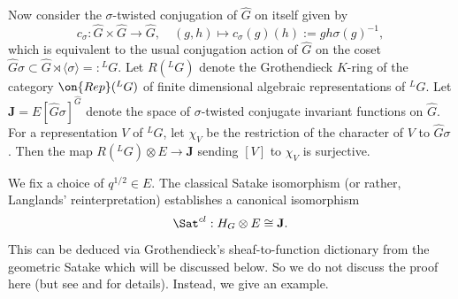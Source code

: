 \documentclass[11pt]{amsart}
\theoremstyle{definition}
\theoremstyle{definition}
\theoremstyle{definition}
\numberwithin{equation}{subsection}
\begin{document}
\medskip


Now consider the $\sigma$-twisted conjugation of $\hat G$ on itself given by
\begin{equation}
\label{E:twist conj}
c_\sigma:\hat G\times \hat G\to\hat G, \quad (g,h)\mapsto c_\sigma(g)(h):=gh\sigma(g)^{-1},
\end{equation}
which is equivalent to the usual conjugation action of $\hat G$ on the coset $\hat G\sigma\subset \hat G\rtimes\langle\sigma\rangle=:{^L}G$. Let $R({^L}G)$ denote the Grothendieck $K$-ring of the category $\on{Rep}({^L}G)$ of finite dimensional algebraic representations of ${^L}G$.
Let $\mathbf J= E[\hat G\sigma]^{\hat G}$ denote the space of $\sigma$-twisted conjugate invariant functions on $\hat G$. For a representation $V$ of ${^L}G$, let $\chi_V$ be the restriction of the character of $V$ to $\hat G\sigma$.
Then the map $R({^L}G)\otimes E\to \mathbf J$ sending $[V]$ to $\chi_V$ is surjective.

We fix a choice of $q^{1/2}\in E$.
The classical Satake isomorphism (or rather, Langlands' reinterpretation) establishes a canonical isomorphism
\begin{equation}\label{Sat isom}
\Sat^{cl}: H_G\otimes E\cong \mathbf J.
\end{equation}
This can be deduced via Grothendieck's sheaf-to-function dictionary from the geometric Satake which will be discussed below. So we do not discuss the proof here (but see \cite[\S 5.6]{Zh2} and \cite[\S 3.5]{XZ} for details). Instead, we give an example.
\end{document}
